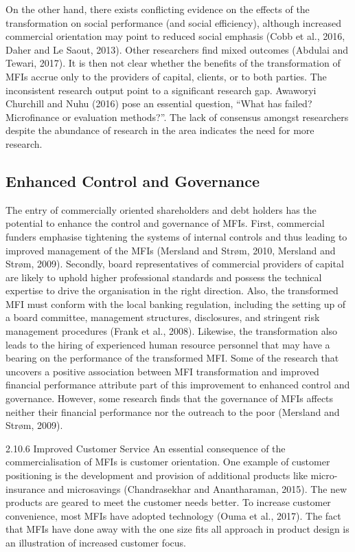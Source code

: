 \documentclass[a4paper, nobind]{templates/ociamthesis}
\begin{document}
On the other hand, there exists conflicting evidence on the effects of the transformation on social performance (and social efficiency), although increased commercial orientation may point to reduced social emphasis (Cobb et al., 2016, Daher and Le Saout, 2013). Other researchers find mixed outcomes (Abdulai and Tewari, 2017). It is then not clear whether the benefits of the transformation of MFIs accrue only to the providers of capital, clients, or to both parties. The inconsistent research output point to a significant research gap. Awaworyi Churchill and Nuhu (2016) pose an essential question, ``What has failed? Microfinance or evaluation methods?''. The lack of consensus amongst researchers despite the abundance of research in the area indicates the need for more research.

\hypertarget{enhanced-control-and-governance}{%
\subsection{Enhanced Control and Governance}\label{enhanced-control-and-governance}}

\noindent The entry of commercially oriented shareholders and debt holders has the potential to enhance the control and governance of MFIs. First, commercial funders emphasise tightening the systems of internal controls and thus leading to improved management of the MFIs (Mersland and Strøm, 2010, Mersland and Strøm, 2009). Secondly, board representatives of commercial providers of capital are likely to uphold higher professional standards and possess the technical expertise to drive the organisation in the right direction.
Also, the transformed MFI must conform with the local banking regulation, including the setting up of a board committee, management structures, disclosures, and stringent risk management procedures (Frank et al., 2008). Likewise, the transformation also leads to the hiring of experienced human resource personnel that may have a bearing on the performance of the transformed MFI. Some of the research that uncovers a positive association between MFI transformation and improved financial performance attribute part of this improvement to enhanced control and governance. However, some research finds that the governance of MFIs affects neither their financial performance nor the outreach to the poor (Mersland and Strøm, 2009).

2.10.6 Improved Customer Service
\noindent An essential consequence of the commercialisation of MFIs is customer orientation. One example of customer positioning is the development and provision of additional products like micro-insurance and microsavings (Chandrasekhar and Anantharaman, 2015). The new products are geared to meet the customer needs better. To increase customer convenience, most MFIs have adopted technology (Ouma et al., 2017). The fact that MFIs have done away with the one size fits all approach in product design is an illustration of increased customer focus.
\end{document}
